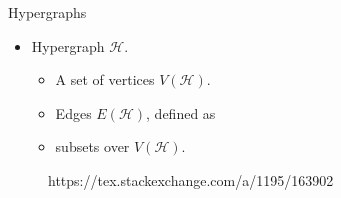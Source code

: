 \begin{frame}[t]{Hypergraphs}
	\begin{minipage}{.59\linewidth}
	\begin{itemize}
		\item Hypergraph $\mathcal{H}$.
			\begin{itemize}
				\item A set of vertices $V(\mathcal{H})$.
				\item Edges $E(\mathcal{H})$, defined as 
				\item[] subsets over $V(\mathcal{H})$.
			\end{itemize}




	\end{itemize}
\end{minipage}
\begin{minipage}{.39\linewidth}
\centering
\begin{figure}[htpb]
	\centering
	
	\caption{\tiny https://tex.stackexchange.com/a/1195/163902}%
\end{figure}
\end{minipage}
\end{frame}

